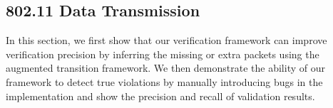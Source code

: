 \subsection{802.11 Data Transmission}
\label{subsec:tx}

In this section, we first show that our
verification framework can improve verification precision by inferring
the missing or extra packets using the augmented transition
framework. We then demonstrate the ability of our framework to detect true violations by
manually introducing bugs in the \ns{} implementation and show the precision and
recall of validation results.

